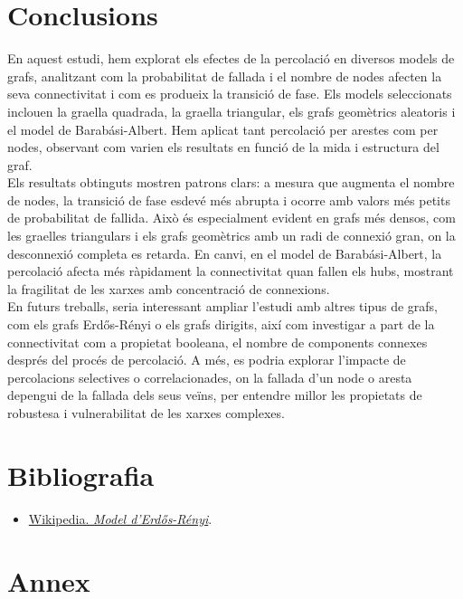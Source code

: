 \documentclass[a4paper]{article}
\begin{document}
	\newpage	
	\section{Conclusions}
	
	En aquest estudi, hem explorat els efectes de la percolació en diversos models de grafs, analitzant com la probabilitat de fallada i el nombre de nodes afecten la seva connectivitat i com es produeix la transició de fase. Els models seleccionats inclouen la graella quadrada, la graella triangular, els grafs geomètrics aleatoris i el model de Barabási-Albert. Hem aplicat tant percolació per arestes com per nodes, observant com varien els resultats en funció de la mida i estructura del graf. \\
	
	Els resultats obtinguts mostren patrons clars: a mesura que augmenta el nombre de nodes, la transició de fase esdevé més abrupta i ocorre amb valors més petits de probabilitat de fallida. Això és especialment evident en grafs més densos, com les graelles triangulars i els grafs geomètrics amb un radi de connexió gran, on la desconnexió completa es retarda. En canvi, en el model de Barabási-Albert, la percolació afecta més ràpidament la connectivitat quan fallen els hubs, mostrant la fragilitat de les xarxes amb concentració de connexions. \\
	
	En futurs treballs, seria interessant ampliar l'estudi amb altres tipus de grafs, com els grafs Erdős-Rényi o els grafs dirigits, així com investigar a part de la connectivitat com a propietat booleana, el nombre de components connexes després del procés de percolació. A més, es podria explorar l'impacte de percolacions selectives o correlacionades, on la fallada d'un node o aresta depengui de la fallada dels seus veïns, per entendre millor les propietats de robustesa i vulnerabilitat de les xarxes complexes.
	
	\newpage
	\section{Bibliografia}
	
	\begin{itemize}
		\item \href{https://ca.wikipedia.org/wiki/Model_d%27Erd%C5%91s-R%C3%A9nyi}{Wikipedia. \textit{Model d'Erdős-Rényi}}.
	\end{itemize}
	
	\newpage
	\section{Annex}
	
	
\end{document}

